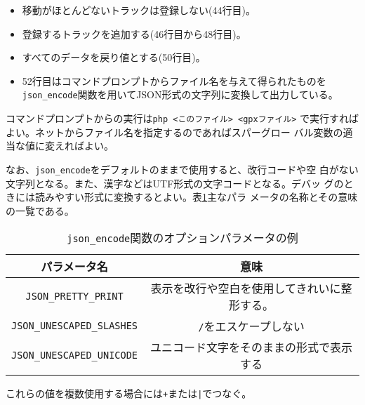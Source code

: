  \begin{itemize}
  \item 移動がほとんどないトラックは登録しない(44行目)。
  \item 登録するトラックを追加する(46行目から48行目)。
  \item すべてのデータを戻り値とする(50行目)。
	\item 52行目はコマンドプロンプトからファイル名を与えて得られたものを
				\Verb+json_encode+関数を用いてJSON形式の文字列に変換して出力している。
 \end{itemize}
 コマンドプロンプトからの実行は\texttt{php <このファイル> <gpxファイル>}
 で実行すればよい。ネットからファイル名を指定するのであればスパーグロー
 バル変数の適当な値に変えればよい。

 
なお、\Verb+json_encode+をデフォルトのままで使用すると、改行コードや空
白がない文字列となる。また、漢字などはUTF形式の文字コードとなる。デバッ
グのときには読みやすい形式に変換するとよい。表\ref{json_encode}主なパラ
メータの名称とその意味の一覧である。
\begin{table}[htb]
 \caption{\texttt{json\_encode}関数のオプションパラメータの例}\label{json_encode}
 \begin{center}
\begin{tabular}{|c|c|}
 \hline
 パラメータ名& 意味\\\hline
 \Verb+JSON_PRETTY_PRINT+& 表示を改行や空白を使用してきれいに整形する。
		 \\ \hline
 \Verb+JSON_UNESCAPED_SLASHES+& \texttt{/}をエスケープしない\\ \hline
 \Verb+JSON_UNESCAPED_UNICODE+& ユニコード文字をそのままの形式で表示する\\ \hline
\end{tabular}
 \end{center}
\end{table}

これらの値を複数使用する場合には\texttt{+}または\texttt{|}でつなぐ。